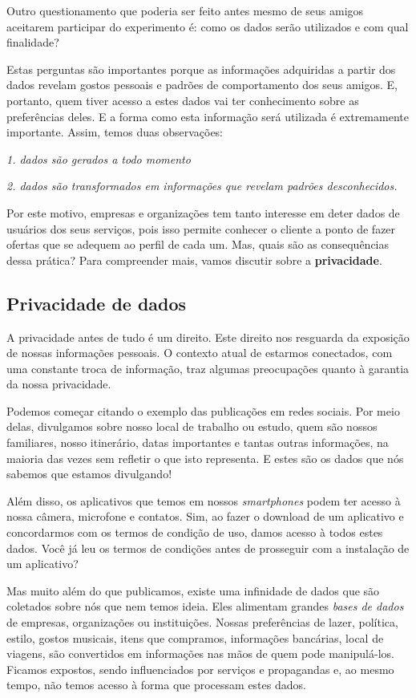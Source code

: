 \documentclass[
  portuguese,
  oneside]{book}
\begin{document}
Outro questionamento que poderia ser feito antes mesmo de seus amigos aceitarem participar do experimento é: como os dados serão utilizados e com qual finalidade?

Estas perguntas são importantes porque as informações adquiridas a partir dos dados revelam gostos pessoais e padrões de comportamento dos seus amigos. E, portanto, quem tiver acesso a estes dados vai ter conhecimento sobre as preferências deles. E a forma como esta informação será utilizada é extremamente importante. Assim, temos duas observações:

\emph{1. dados são gerados a todo momento}

\emph{2. dados são transformados em informações que revelam padrões desconhecidos.}

Por este motivo, empresas e organizações tem tanto interesse em deter dados de usuários dos seus serviços, pois isso permite conhecer o cliente a ponto de fazer ofertas que se adequem ao perfil de cada um. Mas, quais são as consequências dessa prática? Para compreender mais, vamos discutir sobre a \textbf{privacidade}.

\hypertarget{privacidade-de-dados}{%
\subsection{Privacidade de dados}\label{privacidade-de-dados}}

A privacidade antes de tudo é um direito. Este direito nos resguarda da exposição de nossas informações pessoais. O contexto atual de estarmos conectados, com uma constante troca de informação, traz algumas preocupações quanto à garantia da nossa privacidade.

Podemos começar citando o exemplo das publicações em redes sociais. Por meio delas, divulgamos sobre nosso local de trabalho ou estudo, quem são nossos familiares, nosso itinerário, datas importantes e tantas outras informações, na maioria das vezes sem refletir o que isto representa. E estes são os dados que nós sabemos que estamos divulgando!

Além disso, os aplicativos que temos em nossos \emph{smartphones} podem ter acesso à nossa câmera, microfone e contatos. Sim, ao fazer o download de um aplicativo e concordarmos com os termos de condição de uso, damos acesso à todos estes dados. Você já leu os termos de condições antes de prosseguir com a instalação de um aplicativo?

Mas muito além do que publicamos, existe uma infinidade de dados que são coletados sobre nós que nem temos ideia. Eles alimentam grandes \emph{bases de dados} de empresas, organizações ou instituições. Nossas preferências de lazer, política, estilo, gostos musicais, itens que compramos, informações bancárias, local de viagens, são convertidos em informações nas mãos de quem pode manipulá-los. Ficamos expostos, sendo influenciados por serviços e propagandas e, ao mesmo tempo, não temos acesso à forma que processam estes dados.
\end{document}
